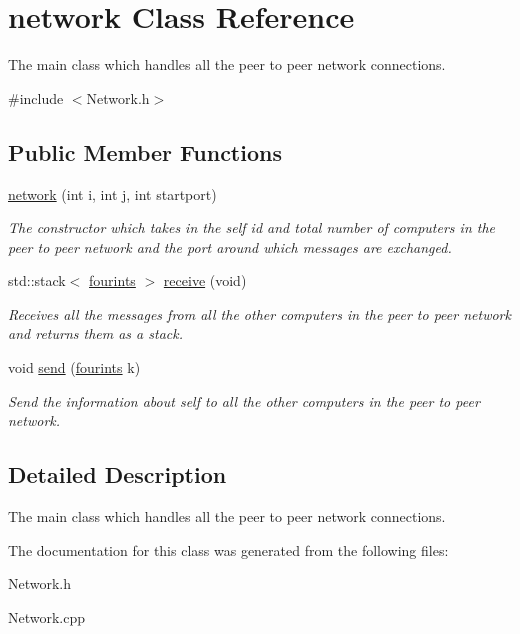 \hypertarget{classnetwork}{\section{network Class Reference}
\label{classnetwork}
}


The main class which handles all the peer to peer network connections.  




{\ttfamily \#include $<$Network.\-h$>$}

\subsection*{Public Member Functions}
\begin{DoxyCompactItemize}
\item 
\hypertarget{classnetwork_a5ea9dc00957d0b6be361d54a6cddb749}{\hyperlink{classnetwork_a5ea9dc00957d0b6be361d54a6cddb749}{network} (int i, int j, int startport)}\label{classnetwork_a5ea9dc00957d0b6be361d54a6cddb749}

\begin{DoxyCompactList}\small\item\em The constructor which takes in the self id and total number of computers in the peer to peer network and the port around which messages are exchanged. \end{DoxyCompactList}\item 
\hypertarget{classnetwork_a2af46be674cfe8274fd1fce9d7a4ca02}{std\-::stack$<$ \hyperlink{structfourints}{fourints} $>$ \hyperlink{classnetwork_a2af46be674cfe8274fd1fce9d7a4ca02}{receive} (void)}\label{classnetwork_a2af46be674cfe8274fd1fce9d7a4ca02}

\begin{DoxyCompactList}\small\item\em Receives all the messages from all the other computers in the peer to peer network and returns them as a stack. \end{DoxyCompactList}\item 
\hypertarget{classnetwork_af5cf8f369b4cf9458abd464fda09fa51}{void \hyperlink{classnetwork_af5cf8f369b4cf9458abd464fda09fa51}{send} (\hyperlink{structfourints}{fourints} k)}\label{classnetwork_af5cf8f369b4cf9458abd464fda09fa51}

\begin{DoxyCompactList}\small\item\em Send the information about self to all the other computers in the peer to peer network. \end{DoxyCompactList}\end{DoxyCompactItemize}


\subsection{Detailed Description}
The main class which handles all the peer to peer network connections. 

The documentation for this class was generated from the following files\-:\begin{DoxyCompactItemize}
\item 
Network.\-h\item 
Network.\-cpp\end{DoxyCompactItemize}
